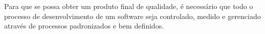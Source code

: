 Para que se possa obter um produto final de qualidade, é necessário que
todo o processo de desenvolvimento de um software seja controlado, medido e gerenciado através de processos padronizados e bem definidos.


